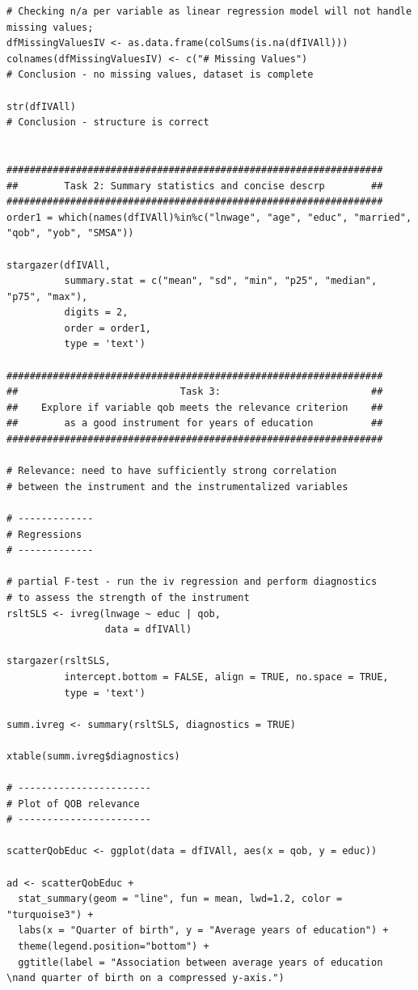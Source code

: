 \documentclass{article}
\begin{document}
\begin{tiny}
\begin{verbatim}
# Checking n/a per variable as linear regression model will not handle missing values;
dfMissingValuesIV <- as.data.frame(colSums(is.na(dfIVAll)))
colnames(dfMissingValuesIV) <- c("# Missing Values")
# Conclusion - no missing values, dataset is complete

str(dfIVAll)
# Conclusion - structure is correct


#################################################################
##        Task 2: Summary statistics and concise descrp        ##
#################################################################
order1 = which(names(dfIVAll)%in%c("lnwage", "age", "educ", "married", "qob", "yob", "SMSA"))

stargazer(dfIVAll, 
          summary.stat = c("mean", "sd", "min", "p25", "median", "p75", "max"), 
          digits = 2,
          order = order1,
          type = 'text')

#################################################################
##                            Task 3:                          ##
##    Explore if variable qob meets the relevance criterion    ##
##        as a good instrument for years of education          ##
#################################################################

# Relevance: need to have sufficiently strong correlation 
# between the instrument and the instrumentalized variables

# -------------
# Regressions 
# -------------

# partial F-test - run the iv regression and perform diagnostics 
# to assess the strength of the instrument
rsltSLS <- ivreg(lnwage ~ educ | qob,
                 data = dfIVAll)

stargazer(rsltSLS, 
          intercept.bottom = FALSE, align = TRUE, no.space = TRUE,
          type = 'text')

summ.ivreg <- summary(rsltSLS, diagnostics = TRUE)

xtable(summ.ivreg$diagnostics)

# -----------------------
# Plot of QOB relevance
# -----------------------

scatterQobEduc <- ggplot(data = dfIVAll, aes(x = qob, y = educ))

ad <- scatterQobEduc +
  stat_summary(geom = "line", fun = mean, lwd=1.2, color = "turquoise3") +
  labs(x = "Quarter of birth", y = "Average years of education") +
  theme(legend.position="bottom") +
  ggtitle(label = "Association between average years of education \nand quarter of birth on a compressed y-axis.")


\end{verbatim}
\end{tiny}
\end{document}
